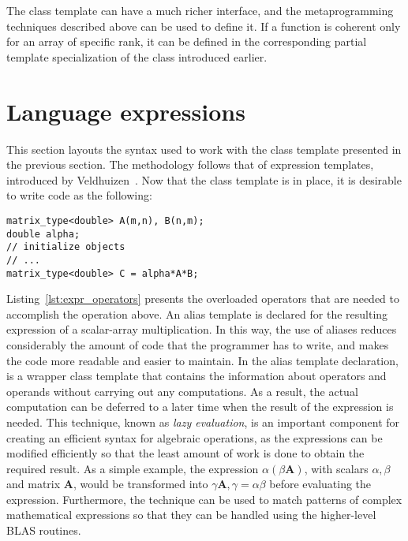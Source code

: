\documentclass[11pt]{article}
\newcommand{\code}[1]{{\footnotesize\ttfamily{#1}}}
\begin{document}
The \code{Array} class template can have a much richer interface, and the metaprogramming techniques described above can be used to define it. If a function is coherent only for an array of specific rank, it can be defined in the corresponding partial template specialization of the \code{Array\_traits} class introduced earlier.

\section{Language expressions} \label{sec:expr}

This section layouts the syntax used to work with the \code{Array} class template presented in the previous section. The methodology follows that of expression templates, introduced by Veldhuizen~\cite{Veldhuizen:1995}.
Now that the \code{Array} class template is in place, it is desirable to write code as the following:
\begin{lstlisting}[frame=none]
matrix_type<double> A(m,n), B(n,m);
double alpha;
// initialize objects
// ...
matrix_type<double> C = alpha*A*B;
\end{lstlisting}
Listing~\ref{lst:expr_operators} presents the overloaded operators that are needed to accomplish the operation above.
An alias template is declared for the resulting expression of a scalar-array multiplication. In this way, the use of aliases reduces considerably the amount of code that the programmer has to write, and makes the code more readable and easier to maintain.
In the \code{SAm<d,T>} alias template declaration, \code{Expr} is a wrapper class template that contains the information about operators and operands without carrying out any computations.
As a result, the actual computation can be deferred to a later time when the result of the expression is needed. This technique, known as \emph{lazy evaluation}, is an important component for creating an efficient syntax for algebraic operations, as the expressions can be modified efficiently so that the least amount of work is done to obtain the required result.
As a simple example, the expression $\alpha \left( \beta \mathbf{A} \right)$, with scalars $\alpha, \beta$ and matrix $\mathbf{A}$, would be transformed into $\gamma\mathbf{A}, \gamma=\alpha\beta$ before evaluating the expression. Furthermore, the technique can be used to match patterns of complex mathematical expressions so that they can be handled using the higher-level BLAS routines.
\end{document}
